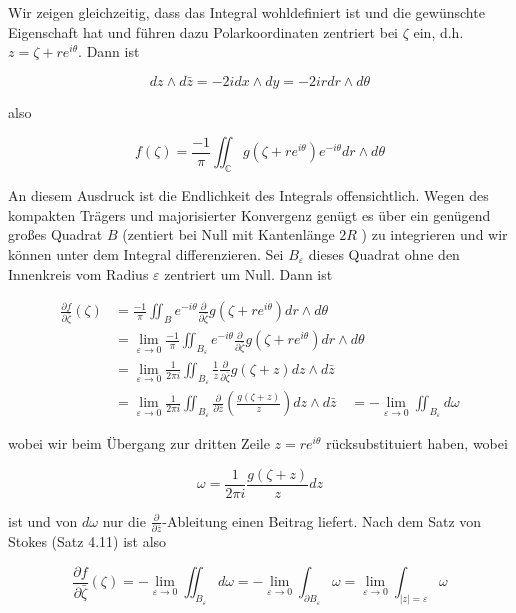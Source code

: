 \documentclass[10pt, letterpaper]{article}
\begin{document}
Wir zeigen gleichzeitig, dass das Integral wohldefiniert ist und die gewünschte Eigenschaft hat und führen dazu Polarkoordinaten zentriert bei $\zeta$ ein, d.h. $z= \zeta+r e^{i \theta}$. Dann ist

$$
d z \wedge d \bar{z}=-2 i d x \wedge d y=-2 i r d r \wedge d \theta
$$

also

$$
f(\zeta)=\frac{-1}{\pi} \iint_{\mathbb{C}} g\left(\zeta+r e^{i \theta}\right) e^{-i \theta} d r \wedge d \theta
$$

An diesem Ausdruck ist die Endlichkeit des Integrals offensichtlich. Wegen des kompakten Trägers und majorisierter Konvergenz genügt es über ein genügend großes Quadrat $B$ (zentiert bei Null mit Kantenlänge $2 R$ ) zu integrieren und wir können unter dem Integral differenzieren. Sei $B_{\varepsilon}$ dieses Quadrat ohne den Innenkreis vom Radius $\varepsilon$ zentriert um Null. Dann ist

$$
\begin{aligned}
\frac{\partial f}{\partial \bar{\zeta}}(\zeta) & =\frac{-1}{\pi} \iint_{B} e^{-i \theta} \frac{\partial}{\partial \bar{\zeta}} g\left(\zeta+r e^{i \theta}\right) d r \wedge d \theta \\
& =\lim _{\varepsilon \rightarrow 0} \frac{-1}{\pi} \iint_{B_{\varepsilon}} e^{-i \theta} \frac{\partial}{\partial \bar{\zeta}} g\left(\zeta+r e^{i \theta}\right) d r \wedge d \theta \\
& =\lim _{\varepsilon \rightarrow 0} \frac{1}{2 \pi i} \iint_{B_{\varepsilon}} \frac{1}{z} \frac{\partial}{\partial \bar{\zeta}} g(\zeta+z) d z \wedge d \bar{z} \\
& =\lim _{\varepsilon \rightarrow 0} \frac{1}{2 \pi i} \iint_{B_{\varepsilon}} \frac{\partial}{\partial \bar{z}}\left(\frac{g(\zeta+z)}{z}\right) d z \wedge d \bar{z} \quad=-\lim _{\varepsilon \rightarrow 0} \iint_{B_{\varepsilon}} d \omega
\end{aligned}
$$

wobei wir beim Übergang zur dritten Zeile $z=r e^{i \theta}$ rücksubstituiert haben, wobei

$$
\omega=\frac{1}{2 \pi i} \frac{g(\zeta+z)}{z} d z
$$

ist und von $d \omega$ nur die $\frac{\partial}{\partial \bar{z}}$-Ableitung einen Beitrag liefert. Nach dem Satz von Stokes (Satz 4.11) ist also

$$
\frac{\partial f}{\partial \bar{\zeta}}(\zeta)=-\lim _{\varepsilon \rightarrow 0} \iint_{B_{\varepsilon}} d \omega=-\lim _{\varepsilon \rightarrow 0} \int_{\partial B_{\varepsilon}} \omega=\lim _{\varepsilon \rightarrow 0} \int_{|z|=\varepsilon} \omega
$$
\end{document}
